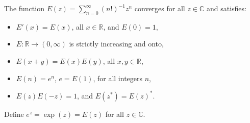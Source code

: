 The function $E(z) = \sum_{n=0}^{\infty} (n!)^{-1} z^n$ converges for all $z \in \mathbb{C}$ and satisfies:
\begin{itemize}
\item[(a)] $E'(x) = E(x)$, all $x \in \mathbb{R}$, and $E(0) = 1$,
\item[(b)] $E: \mathbb{R} \to (0, \infty)$ is strictly increasing and onto,
\item[(c)] $E(x + y) = E(x)E(y)$, all $x, y \in \mathbb{R}$,
\item[(d)] $E(n) = e^n$, $e = E(1)$, for all integers $n$,
\item[(e)] $E(z)E(-z) = 1$, and $E(z^*) = E(z)^*$.
\end{itemize}
Define $e^z = \exp(z) = E(z)$ for all $z \in \mathbb{C}$.
